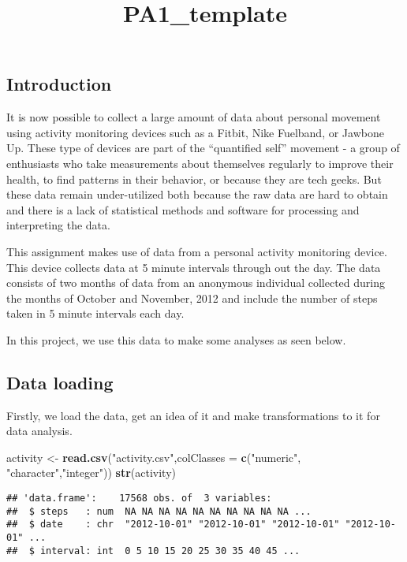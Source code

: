 \documentclass[]{article}
\title{PA1\_template}
\author{}
\date{}
\newenvironment{Shaded}{\begin{snugshade}}{\end{snugshade}}
\newcommand{\KeywordTok}[1]{\textcolor[rgb]{0.13,0.29,0.53}{\textbf{{#1}}}}
\newcommand{\DataTypeTok}[1]{\textcolor[rgb]{0.13,0.29,0.53}{{#1}}}
\newcommand{\StringTok}[1]{\textcolor[rgb]{0.31,0.60,0.02}{{#1}}}
\newcommand{\NormalTok}[1]{{#1}}
\begin{document}
\maketitle


\subsection{Introduction}\label{introduction}

It is now possible to collect a large amount of data about personal
movement using activity monitoring devices such as a Fitbit, Nike
Fuelband, or Jawbone Up. These type of devices are part of the
``quantified self'' movement - a group of enthusiasts who take
measurements about themselves regularly to improve their health, to find
patterns in their behavior, or because they are tech geeks. But these
data remain under-utilized both because the raw data are hard to obtain
and there is a lack of statistical methods and software for processing
and interpreting the data.

This assignment makes use of data from a personal activity monitoring
device. This device collects data at 5 minute intervals through out the
day. The data consists of two months of data from an anonymous
individual collected during the months of October and November, 2012 and
include the number of steps taken in 5 minute intervals each day.

In this project, we use this data to make some analyses as seen below.

\subsection{Data loading}\label{data-loading}

Firstly, we load the data, get an idea of it and make transformations to
it for data analysis.

\begin{Shaded}
\begin{Highlighting}[]
\NormalTok{activity <-}\StringTok{ }\KeywordTok{read.csv}\NormalTok{(}\StringTok{"activity.csv"}\NormalTok{,}\DataTypeTok{colClasses =} \KeywordTok{c}\NormalTok{(}\StringTok{"numeric"}\NormalTok{, }\StringTok{"character"}\NormalTok{,}\StringTok{"integer"}\NormalTok{))}
\KeywordTok{str}\NormalTok{(activity)}
\end{Highlighting}
\end{Shaded}

\begin{verbatim}
## 'data.frame':    17568 obs. of  3 variables:
##  $ steps   : num  NA NA NA NA NA NA NA NA NA NA ...
##  $ date    : chr  "2012-10-01" "2012-10-01" "2012-10-01" "2012-10-01" ...
##  $ interval: int  0 5 10 15 20 25 30 35 40 45 ...
\end{verbatim}
\end{document}
